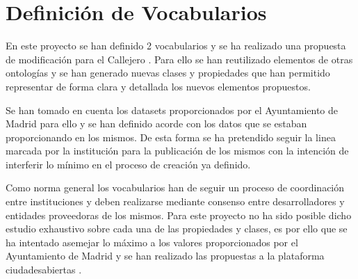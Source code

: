 \chapter{Definición de Vocabularios}

En este proyecto se han definido 2 vocabularios y se ha realizado una propuesta de modificación para el Callejero \cite{ciudadesbiertas_callejero}. Para ello se han reutilizado elementos de otras ontologías y se han generado nuevas clases y propiedades que han permitido representar de forma clara y detallada los nuevos elementos propuestos.


Se han tomado en cuenta los datasets proporcionados por el Ayuntamiento de Madrid \cite{datosabiertos_ayuntmadrid} para ello y se han definido acorde con los datos que se estaban proporcionando en los mismos. De esta forma se ha pretendido seguir la linea marcada por la institución para la publicación de los mismos con la intención de interferir lo mínimo en el proceso de creación ya definido.


Como norma general los vocabularios han de seguir un proceso de coordinación entre instituciones y deben realizarse mediante consenso entre desarrolladores y entidades proveedoras de los mismos. Para este proyecto no ha sido posible dicho estudio exhaustivo sobre cada una de las propiedades y clases, es por ello que se ha intentado asemejar lo máximo a los valores proporcionados por el Ayuntamiento de Madrid y se han realizado las propuestas a la plataforma ciudadesabiertas \cite{ciudadesabiertas_catalogoVocabs}.
